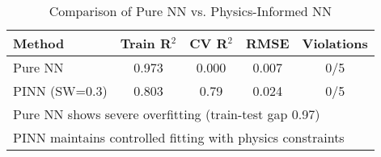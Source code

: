 
\begin{table}[htbp]
\centering
\caption{Comparison of Pure NN vs. Physics-Informed NN}
\label{tab:pure_nn_comparison}
\begin{tabular}{lcccc}
\hline
\textbf{Method} & \textbf{Train R$^2$} & \textbf{CV R$^2$} & \textbf{RMSE} & \textbf{Violations} \\
\hline
Pure NN & 0.973 & 0.000 & 0.007 & 0/5 \\
PINN (SW=0.3) & 0.803 & 0.79 & 0.024 & 0/5 \\
\hline
\multicolumn{5}{l}{\small Pure NN shows severe overfitting (train-test gap 0.97)} \\
\multicolumn{5}{l}{\small PINN maintains controlled fitting with physics constraints} \\
\end{tabular}
\end{table}

